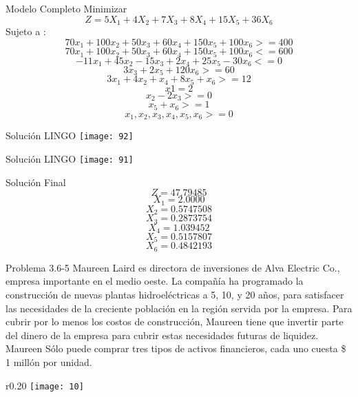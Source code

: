 \documentclass{beamer}
\begin{document}
\begin{frame}[fragile]{Modelo Completo}
Minimizar\\
\[Z = 5X_{1} + 4X_{2} +7X_{3} + 8X_{4} + 15X_{5} +36X_{6}\]
Sujeto a :\\
\[70x_{1} + 100x_{2} + 50x_{3} + 60x_{4} + 150x_{5} + 100x_{6} >= 400\]
\[70x_{1} + 100x_{2} + 50x_{3} + 60x_{4} + 150x_{5} + 100x_{6} <= 600\]
\[-11x_{1} + 45x_{2} - 15x_{3} + 2x_{4} + 25x_{5} - 30x_{6}  <=  0\]
\[3x_{3} + 2x_{5} + 120x_{6} >= 60\]
\[3x_{1} + 4x_{2} + x_{4} + 8x_{5} + x_{6} >= 12\]
\[x{1} = 2\]
\[x_{2} - 2x_{3} >= 0\]
\[x_{5} + x_{6} >= 1 \]
\[x_{1}, x_{2}, x_{3}, x_{4}, x_{5}, x_{6} >= 0\]

\end{frame}

\begin{frame}[fragile]{Solución LINGO}
    \texttt{[image: 92]}
\end{frame}
\begin{frame}[fragile]{Solución LINGO}
    \texttt{[image: 91]}
\end{frame}

\begin{frame}[fragile]{Solución Final}
\[Z = 47.79485 \]
\[X_{1} = 2.0000\]
\[X_{2} = 0.5747508\]
\[X_{3} = 0.2873754\]
\[X_{4} = 1.039452\]
\[X_{5} = 0.5157807\]
\[X_{6} = 0.4842193\]
\end{frame}

\begin{frame}[t,fragile]{Problema 3.6-5 }
Maureen Laird es directora de inversiones de Alva Electric Co., empresa importante en el medio oeste. La compañía ha programado la construcción de nuevas plantas hidroeléctricas a 5, 10, y 20 años, para satisfacer las necesidades de la creciente población en la región servida por la empresa. Para cubrir por lo menos los costos de construcción, Maureen tiene que invertir parte del dinero de  la empresa para cubrir estas necesidades futuras de liquidez. Maureen Sólo puede comprar tres tipos de activos financieros, cada uno  cuesta \$ 1 millón por unidad.
 \begin{wrapfigure}{r}{0.20\textwidth}
    \centering
    \texttt{[image: 10]}
\end{wrapfigure}\\
\end{frame}
\end{document}
